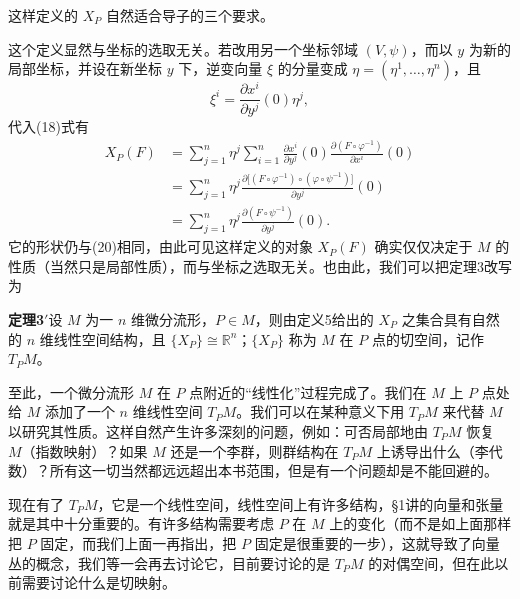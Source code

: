 这样定义的 $X_P$ 自然适合导子的三个要求。

这个定义显然与坐标的选取无关。若改用另一个坐标邻域 $(V,\psi)$，而以 $y$ 为新的局部坐标，并设在新坐标 $y$ 下，逆变向量 $\xi$ 的分量变成 $\eta=(\eta^1,\ldots,\eta^n)$，且
\[
 \xi^i=\frac{\partial x^i}{\partial y^j}(0)\eta^j,
\]
代入(18)式有
\[
 \begin{aligned}
 X_P(F)
 &=\sum_{j=1}^n\eta^j
 \sum_{i=1}^n\frac{\partial x^i}{\partial y^j}(0)
 \frac{\partial(F\circ\varphi^{-1})}{\partial x^i}(0)\\
 &=\sum_{j=1}^n\eta^j
 \frac{\partial\bigl[(F\circ\varphi^{-1})\circ(\varphi\circ\psi^{-1})\bigr]}
 {\partial y^j}(0)\\
 &=\sum_{j=1}^n\eta^j\frac{\partial(F\circ\psi^{-1})}{\partial y^j}(0).
 \end{aligned}
\]
它的形状仍与(20)相同，由此可见这样定义的对象 $X_P(F)$ 确实仅仅决定于 $M$ 的性质（当然只是局部性质），而与坐标之选取无关。也由此，我们可以把定理3改写为

\noindent\textbf{定理3$'$}\quad 设 $M$ 为一 $n$ 维微分流形，$P\in M$，则由定义5给出的 $X_P$ 之集合具有自然的 $n$ 维线性空间结构，且 $\{X_P\}\cong\mathbb R^n$；$\{X_P\}$ 称为 $M$ 在 $P$ 点的切空间，记作 $T_PM$。

至此，一个微分流形 $M$ 在 $P$ 点附近的“线性化”过程完成了。我们在 $M$ 上 $P$ 点处给 $M$ 添加了一个 $n$ 维线性空间 $T_PM$。我们可以在某种意义下用 $T_PM$ 来代替 $M$ 以研究其性质。这样自然产生许多深刻的问题，例如：可否局部地由 $T_PM$ 恢复 $M$（指数映射）？如果 $M$ 还是一个李群，则群结构在 $T_PM$ 上诱导出什么（李代数）？所有这一切当然都远远超出本书范围，但是有一个问题却是不能回避的。

现在有了 $T_PM$，它是一个线性空间，线性空间上有许多结构，§1讲的向量和张量就是其中十分重要的。有许多结构需要考虑 $P$ 在 $M$ 上的变化（而不是如上面那样把 $P$ 固定，而我们上面一再指出，把 $P$ 固定是很重要的一步），这就导致了向量丛的概念，我们等一会再去讨论它，目前要讨论的是 $T_PM$ 的对偶空间，但在此以前需要讨论什么是切映射。

